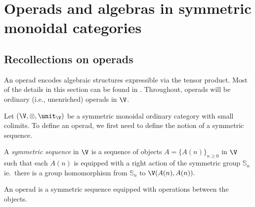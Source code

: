 \documentclass{tac}
\begin{document}
\section{Operads and algebras in symmetric monoidal categories}
\subsection{Recollections on operads}
An operad encodes algebraic structures expressible via the tensor product. Most of the details in this section can be found in \cite{fresse09}. Throughout, operads will be ordinary (i.e., unenriched) operads in $\V$.

Let $(\V, \otimes, \unit_{\V})$ be a symmetric monoidal ordinary category with small colimits. To define an operad, we first need to define the notion of a symmetric sequence. 

\begin{definition}
A \emph{symmetric sequence} in $\V$ is a sequence of objects $A = \{A(n)\}_{n \ge 0}$ in $\V$ such that each $A(n)$ is equipped with a right action of the symmetric group $\mathbb S_n$ ie.\ there is a group homomorphism from $\mathbb S_n$ to $\V(A(n), A(n)).$
\end{definition}

An operad is a symmetric sequence equipped with operations between the objects.
\end{document}
